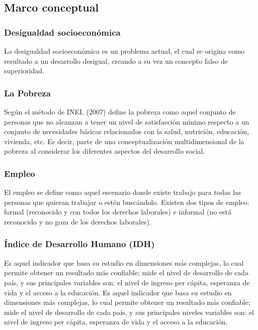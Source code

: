 \subsection{Marco conceptual}

  \subsubsection{Desigualdad socioeconómica}
  
  La desigualdad socioeconómica es un problema actual, el cual se origina como resultado a un desarrollo desigual, creando a su vez un concepto falso de superioridad.
  
  \subsubsection{La Pobreza}
  
  Según el método de INEI, (2007) define la pobreza como aquel conjunto de personas que no alcanzan a tener un nivel de satisfacción mínimo respecto a un conjunto de necesidades básicas relacionados con la salud, nutrición, educación, vivienda, etc. Es decir, parte de una conceptualización multidimensional de la pobreza al considerar los diferentes aspectos del desarrollo social.
  
  \subsubsection{Empleo}
  
  El empleo se define como aquel escenario donde existe trabajo para todas las personas que quieran trabajar o estén buscándolo. Existen dos tipos de empleo: formal (reconocido y con todos los derechos laborales) e informal (no está reconocido y no goza de los derechos laborales).
  
  \subsubsection{Índice de Desarrollo Humano (IDH)}
  
  Es aquel indicador que basa su estudio en dimensiones más complejas, lo cual permite obtener un resultado más confiable; mide el nivel de desarrollo de cada país, y sus principales variables son: el nivel de ingreso per cápita, esperanza de vida y el acceso a la educación. Es aquel indicador que basa su estudio en dimensiones más complejas, lo cual permite obtener un resultado más confiable; mide el nivel de desarrollo de cada país, y sus principales niveles variables son: el nivel de ingreso per cápita, esperanza de vida y el acceso a la educación. 
  
